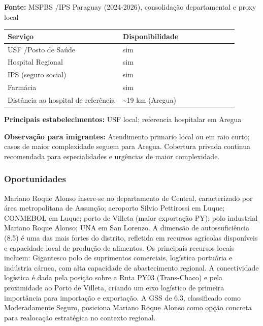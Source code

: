 \textbf{Fonte:} MSPBS /\allowbreak  IPS Paraguay (2024-2026), consolidação
departamental e proxy local

{\def\LTcaptype{none} %
\begin{longtable}{@{}>{\raggedright\arraybackslash}p{0.45\linewidth} >{\raggedright\arraybackslash}p{0.45\linewidth}@{}}
\toprule\noalign{}
Serviço & Disponibilidade \\
\midrule\noalign{}
\endhead
\bottomrule\noalign{}
\endlastfoot
USF /\allowbreak  Posto de Saúde & sim \\
Hospital Regional & sim \\
IPS (seguro social) & sim \\
Farmácia & sim \\
Distância ao hospital de referência & \textasciitilde19 km (Aregua) \\
\end{longtable}
}

\textbf{Principais estabelecimentos:} USF local; referencia hospitalar
em Aregua

\textbf{Observação para imigrantes:} Atendimento primario local ou em
raio curto; casos de maior complexidade seguem para Aregua. Cobertura
privada continua recomendada para especialidades e urgências de maior
complexidade.
\newpage

\subsubsection*{Oportunidades}\label{oport-mariano-roque-alonso-1110}
Mariano Roque Alonso insere-se no departamento de Central, caracterizado por área metropolitana de Assunção; aeroporto Silvio Pettirossi em Luque; CONMEBOL em Luque; porto de Villeta (maior exportação PY); polo industrial Mariano Roque Alonso; UNA em San Lorenzo. A dimensão de autossuficiência (8.5) é uma das mais fortes do distrito, refletida em recursos agrícolas disponíveis e capacidade local de produção de alimentos. Os principais recursos locais incluem: Gigantesco polo de suprimentos comerciais, logística portuária e indústria cárnea, com alta capacidade de abastecimento regional. A conectividade logística é dada pela posição sobre a Ruta PY03 (Trans-Chaco) e pela proximidade ao Porto de Villeta, criando um eixo logístico de primeira importância para importação e exportação. A GSS de 6.3, classificado como Moderadamente Seguro, posiciona Mariano Roque Alonso como opção concreta para realocação estratégica no contexto regional.

